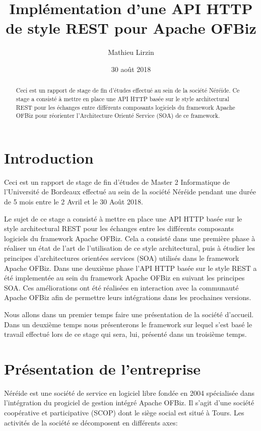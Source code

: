 \documentclass[a4paper, 11pt]{report}
\title{Implémentation d'une API HTTP de style REST pour Apache OFBiz}
\author{Mathieu Lirzin}
\date{30 août 2018}
\begin{document}
\maketitle

\begin{abstract}
  Ceci est un rapport de stage de fin d'études effectué au sein de la
  société Néréide. Ce stage a consisté à mettre en place une API HTTP
  basée sur le style architectural REST pour les échanges entre
  différents composants logiciels du framework Apache OFBiz pour
  réorienter l'Architecture Orienté Service (SOA) de ce framework.
\end{abstract}

\tableofcontents

\chapter*{Introduction}

Ceci est un rapport de stage de fin d'études de Master 2 Informatique
de l'Université de Bordeaux effectué au sein de la société Néréide
pendant une durée de 5 mois entre le 2 Avril et le 30 Août 2018.

Le sujet de ce stage a consisté à mettre en place une API HTTP basée
sur le style architectural REST pour les échanges entre les différents
composants logiciels du framework Apache OFBiz. Cela a consisté dans
une première phase à réaliser un état de l'art de l'utilisation de ce
style architectural, puis à étudier les principes d'architectures
orientées services (SOA) utilisés dans le framework Apache OFBiz.
Dans une deuxième phase l'API HTTP basée sur le style REST a été
implementée au sein du framework Apache OFBiz en suivant les principes
SOA. Ces améliorations ont été réalisées en interaction avec la
communauté Apache OFBiz afin de permettre leurs intégrations dans les
prochaines versions.

Nous allons dans un premier temps faire une présentation de la société
d'accueil. Dans un deuxième temps nous présenterons le framework sur
lequel s'est basé le travail effectué lors de ce stage qui sera, lui,
présenté dans un troisième temps.

\chapter{Présentation de l'entreprise}

Néréide est une société de service en logiciel libre fondée en 2004
spécialisée dans l'intégration du progiciel de gestion intégré Apache
OFBiz.  Il s'agit d'une société coopérative et participative (SCOP)
dont le siège social est situé à Tours.  Les activités de la société
se décomposent en différents axes:
\end{document}
